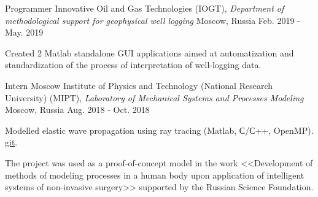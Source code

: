 \begin{cventries}

  \cventry
    {Programmer} %
    {Innovative Oil and Gas Technologies (IOGT), \newline \textit{Department of methodological support for geophysical well logging}} %
    {Moscow, Russia} %
    {Feb. 2019 - May. 2019} %
    {
      \begin{cvitems} %
        \item {Created 2 Matlab standalone GUI applications aimed at automatization and standardization of the process of interpretation of well-logging data.}
      \end{cvitems}
    }


  \cventry
    {Intern} %
    {Moscow Institute of Physics and Technology (National Research University) (MIPT), \newline \textit{Laboratory of Mechanical Systems and Processes Modeling}} %
    {Moscow, Russia} %
    {Aug. 2018 - Oct. 2018} %
    {
      \begin{cvitems} %
        \item {Modelled elastic wave propagation using ray tracing (Matlab, С/С++, OpenMP). \href{https://github.com/PolyachenkoYA/geo}{git}.}
        \item {The project was used as a proof-of-concept model in the work <<Development of methods of modeling processes in a human body upon application of intelligent systems of non-invasive surgery>> supported by the Russian Science Foundation.}
      \end{cvitems}
    }

\end{cventries}
